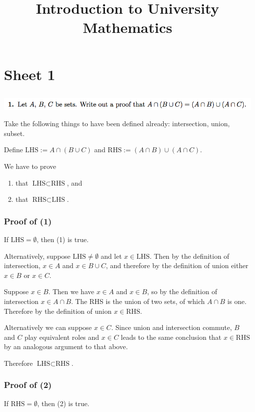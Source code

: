 \documentclass[12pt]{article}
\newcommand{\LHS}{\text{LHS}}
\newcommand{\RHS}{\text{RHS}}
\begin{document}
\title{Introduction to University Mathematics}
\maketitle

\section*{Sheet 1}
\subsection*{} %
\includegraphics[width=400pt]{img/iulm-1-1.png}
\begin{mdframed}

Take the following things to have been defined already: intersection, union, subset.

Define $\LHS := A \cap (B \cup C)$ and $\RHS := (A \cap B) \cup (A \cap C)$.

We have to prove
\begin{enumerate}
\item that $\LHS \subset \RHS$, and
\item that $\RHS \subset \LHS$.
\end{enumerate}

\subsubsection*{Proof of (1)}
If $\LHS = \emptyset$, then (1) is true.

Alternatively, suppose $\LHS \neq \emptyset$ and let $x \in \LHS$. Then by the
definition of intersection, $x \in A$ and $x \in B \cup C$, and therefore by
the definition of union either $x \in B$ or $x \in C$.

Suppose $x \in B$. Then we have $x \in A$ and $x \in B$, so by the definition
of intersection $x \in A \cap B$. The RHS is the union of two sets, of which
$A \cap B$ is one. Therefore by the definition of union $x \in \RHS$.

Alternatively we can suppose $x \in C$. Since union and intersection commute,
$B$ and $C$ play equivalent roles and $x \in C$ leads to the same conclusion
that $x \in \RHS$ by an analogous argument to that above.

Therefore $\LHS \subset \RHS$.

\subsubsection*{Proof of (2)}
If $\RHS = \emptyset$, then (2) is true.


\end{mdframed}
\end{document}
